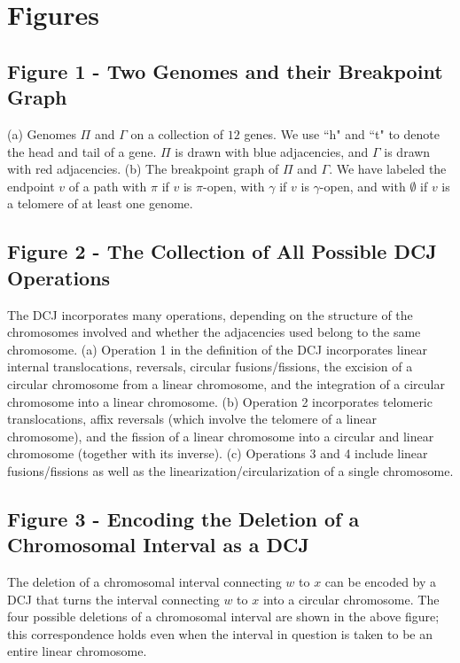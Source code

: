 \section*{Figures}
  \subsection*{Figure 1 - Two Genomes and their Breakpoint Graph}
     (a) Genomes $\Pi$ and $\Gamma$ on a collection of $12$ genes.  We use ``h" and ``t" to denote the head and tail of a gene.  $\Pi$ is drawn with blue adjacencies, and $\Gamma$ is drawn with red adjacencies.  (b) The breakpoint graph of $\Pi$ and $\Gamma$.  We have labeled the endpoint $v$ of a path with $\pi$ if $v$ is $\pi$-open, with $\gamma$ if $v$ is $\gamma$-open, and with $\emptyset$ if $v$ is a telomere of at least one genome.

  \subsection*{Figure 2 - The Collection of All Possible DCJ Operations}
  The DCJ incorporates many operations, depending on the structure of the chromosomes involved and whether the adjacencies used belong to the same chromosome.  (a)  Operation 1 in the definition of the DCJ incorporates linear internal translocations, reversals, circular fusions/fissions, the excision of a circular chromosome from a linear chromosome, and the integration of a circular chromosome into a linear chromosome.  (b) Operation 2 incorporates telomeric translocations, affix reversals (which involve the telomere of a linear chromosome), and the fission of a linear chromosome into a circular and linear chromosome (together with its inverse).  (c)  Operations 3 and 4 include linear fusions/fissions as well as the linearization/circularization of a single chromosome.
  
  \subsection*{Figure 3 - Encoding the Deletion of a Chromosomal Interval as a DCJ}
   The deletion of a chromosomal interval connecting $w$ to $x$ can be encoded by a DCJ that turns the interval connecting $w$ to $x$ into a circular chromosome.  The four possible deletions of a chromosomal interval are shown in the above figure; this correspondence holds even when the interval in question is taken to be an entire linear chromosome.

